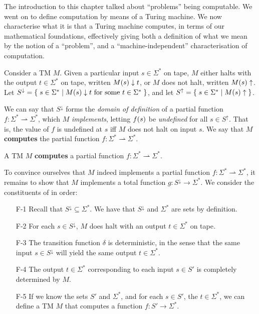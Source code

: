 The introduction to this chapter talked about ``problems'' being computable. We
went on to define computation by means of a Turing machine. We now characterise
what it is that a Turing machine computes, in terms of our mathematical
foundations, effectively giving both a definition of what we mean by the notion
of a ``problem'', and a ``machine-independent'' characterisation of
computation.

Consider a TM $M$. Given a particular input $s\in\Sigma^*$ on tape, $M$ either
halts with the output $t\in\Sigma^*$ on tape, written $M\mathopen{}\left({s}\right)\mathclose{}\downarrow t$, or
$M$ does not halt, written $M\mathopen{}\left({s}\right)\mathclose{}\uparrow$. Let
$S^\downarrow=\mathopen{}\left\{\mathrel{}{s\in\Sigma^* \mathrel{}\mid\mathrel{}{\text{$M\mathopen{}\left({s}\right)\mathclose{}\downarrow t$ for some
$t\in\Sigma^*$}} }\mathrel{}\right\}\mathclose{}$, and let
$S^\uparrow=\mathopen{}\left\{\mathrel{}{s\in\Sigma^*\mathrel{}\mid\mathrel{}{M\mathopen{}\left({s}\right)\mathclose{}\uparrow}}\mathrel{}\right\}\mathclose{}$.

We can say that $S^\downarrow$ forms the \emph{domain of definition} of a
partial function $f : \Sigma^* \rightharpoonup \Sigma^*$, which $M$
\emph{implements}, letting $f\mathopen{}\left({s}\right)\mathclose{}$ be \emph{undefined} for all $s\in
S^\uparrow$.  That is, the value of $f$ is undefined at $s$ iff $M$ does not
halt on input $s$. We say that $M$ \textbf{computes} the partial function $f :
\Sigma^* \rightharpoonup \Sigma^*$.

\begin{definition} A TM $M$ \textbf{computes} a partial function $f : \Sigma^*
\rightharpoonup \Sigma^*$. \end{definition}

To convince ourselves that $M$ indeed implements a partial function $f :
\Sigma^* \rightharpoonup \Sigma^*$, it remains to show that $M$ implements a
total function $g:S^\downarrow \rightarrow \Sigma^*$. We consider the
constituents of  in order:

\begin{enumerate}

\item [F-1] Recall that $S^\downarrow \subseteq \Sigma^*$. We have that
$S^\downarrow$ and $\Sigma^*$ are sets by definition.

\item [F-2] For each $s\in S^\downarrow$, $M$ does halt with an output
$t\in\Sigma^*$ on tape.

\item [F-3] The transition function $\delta$ is
deterministic, in the sense that the same input $s\in S^\downarrow$ will yield
the same output $t\in\Sigma^*$.

\item [F-4] The output $t\in\Sigma^*$ corresponding to each input $s\in S'$ is
completely determined by $M$.

\item [F-5] If we know the sets $S'$ and $\Sigma^*$, and for each $s\in S'$,
the $t\in \Sigma^*$, we can define a TM $M$ that computes a function
$f:S'\rightarrow \Sigma^*$.

\end{enumerate}

